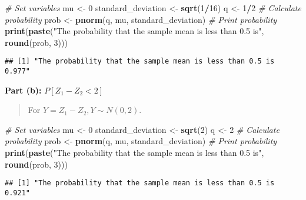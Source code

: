 \documentclass[
]{article}
\newenvironment{Shaded}{\begin{snugshade}}{\end{snugshade}}
\newcommand{\CommentTok}[1]{\textcolor[rgb]{0.56,0.35,0.01}{\textit{#1}}}
\newcommand{\DecValTok}[1]{\textcolor[rgb]{0.00,0.00,0.81}{#1}}
\newcommand{\FunctionTok}[1]{\textcolor[rgb]{0.13,0.29,0.53}{\textbf{#1}}}
\newcommand{\NormalTok}[1]{#1}
\newcommand{\OtherTok}[1]{\textcolor[rgb]{0.56,0.35,0.01}{#1}}
\newcommand{\SpecialCharTok}[1]{\textcolor[rgb]{0.81,0.36,0.00}{\textbf{#1}}}
\newcommand{\StringTok}[1]{\textcolor[rgb]{0.31,0.60,0.02}{#1}}
\begin{document}
\begin{Shaded}
\begin{Highlighting}[]
\CommentTok{\# Set variables}
\NormalTok{mu }\OtherTok{\textless{}{-}} \DecValTok{0}
\NormalTok{standard\_deviation }\OtherTok{\textless{}{-}} \FunctionTok{sqrt}\NormalTok{(}\DecValTok{1}\SpecialCharTok{/}\DecValTok{16}\NormalTok{)}
\NormalTok{q }\OtherTok{\textless{}{-}} \DecValTok{1}\SpecialCharTok{/}\DecValTok{2}
\CommentTok{\# Calculate probability}
\NormalTok{prob }\OtherTok{\textless{}{-}} \FunctionTok{pnorm}\NormalTok{(q, mu, standard\_deviation)}
\CommentTok{\# Print probability}
\FunctionTok{print}\NormalTok{(}\FunctionTok{paste}\NormalTok{(}\StringTok{"The probability that the sample mean is less than 0.5 is"}\NormalTok{, }\FunctionTok{round}\NormalTok{(prob, }\DecValTok{3}\NormalTok{)))}
\end{Highlighting}
\end{Shaded}

\begin{verbatim}
## [1] "The probability that the sample mean is less than 0.5 is 0.977"
\end{verbatim}

\textbf{Part (b):} \(P[Z_1 - Z_2 < 2]\)

\begin{quote}
For \(Y = Z_1 - Z_2, Y \sim N(0, 2)\).
\end{quote}

\begin{Shaded}
\begin{Highlighting}[]
\CommentTok{\# Set variables}
\NormalTok{mu }\OtherTok{\textless{}{-}} \DecValTok{0}
\NormalTok{standard\_deviation }\OtherTok{\textless{}{-}} \FunctionTok{sqrt}\NormalTok{(}\DecValTok{2}\NormalTok{)}
\NormalTok{q }\OtherTok{\textless{}{-}} \DecValTok{2}
\CommentTok{\# Calculate probability}
\NormalTok{prob }\OtherTok{\textless{}{-}} \FunctionTok{pnorm}\NormalTok{(q, mu, standard\_deviation)}
\CommentTok{\# Print probability}
\FunctionTok{print}\NormalTok{(}\FunctionTok{paste}\NormalTok{(}\StringTok{"The probability that the sample mean is less than 0.5 is"}\NormalTok{, }\FunctionTok{round}\NormalTok{(prob, }\DecValTok{3}\NormalTok{)))}
\end{Highlighting}
\end{Shaded}

\begin{verbatim}
## [1] "The probability that the sample mean is less than 0.5 is 0.921"
\end{verbatim}
\end{document}
